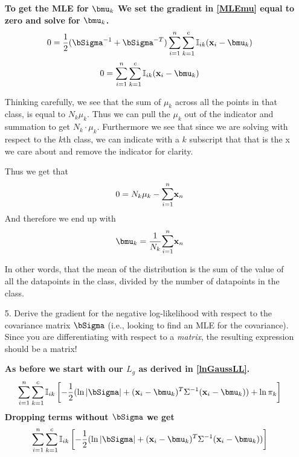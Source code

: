\documentclass[submit]{harvardml}
\newenvironment{answer}{%
    \color{answergreen}\bf}
  {%
  }
\begin{document}
\begin{enumerate}
    \begin{answer}
        To get the MLE for $\bmu_k$ We set the gradient in \eqref{MLEmu} equal to zero and
        solve for $\bmu_k$.
        $$
         0 = \frac{1}{2} 
             (\bSigma^{-1} + \bSigma^{-T})
             \sum_{i=1}^n \sum_{k=1}^c \mBI 
             (\bx_i - \bmu_k) 
             $$
             $$
         0 = \sum_{i=1}^n \sum_{k=1}^c \mBI 
             (\bx_i - \bmu_k) 
        $$

        Thinking carefully, we see that the sum of $\mu_k$ across all the
        points in that class, is equal to $N_k \mu_k$. Thus we can pull the
        $\mu_k$ out of the indicator and summation to get $N_k \cdot \mu_k$.
        Furthermore we see that since we are solving with respect to the $k$th
        class, we can indicate with a $k$ subscript that that is the x we care
        about and remove the indicator for clarity.

        Thus we get that 
        $$ 
        0 = N_k \mu_k - \lsum_{i=1}^n \bx_n
        $$
        And therefore we end up with
        \begin{equation}
            \bmu_k = \frac{1}{N_k} \lsum_{i=1}^n \bx_n
        \end{equation}

        In other words, that the mean of the distribution is the sum of the
        value of all the datapoints in the class, divided by the number of datapoints in the
        class.
    \end{answer}

  \item[5.] Derive the gradient for the negative log-likelihood with respect to the
    covariance matrix $\bSigma$ (i.e., looking to find an MLE for the covariance). 
    Since you are differentiating with respect to a \emph{matrix}, the resulting expression should be a matrix!

 \begin{answer} 
     As before we start with our $L_g$ as derived in \eqref{lnGaussLL}.
        \begin{equation}
            \sum_{i=1}^n \sum_{k=1}^c \mBI \left[ 
            -\frac{1}{2} (
                \ln|\bSigma|+(\bx_i-\bmu_k)^T\Sigma^{-1} (\bx_i-\bmu_k) )
                + \ln\pi_k \right] 
        \end{equation}
        Dropping terms without $\bSigma$ we get
        \begin{equation}
            \sum_{i=1}^n \sum_{k=1}^c \mBI \left[ 
            -\frac{1}{2} (
                \ln|\bSigma|+(\bx_i-\bmu_k)^T\Sigma^{-1} (\bx_i-\bmu_k) )
                \right] 
        \end{equation}



\end{answer}
\end{enumerate}
\end{document}
